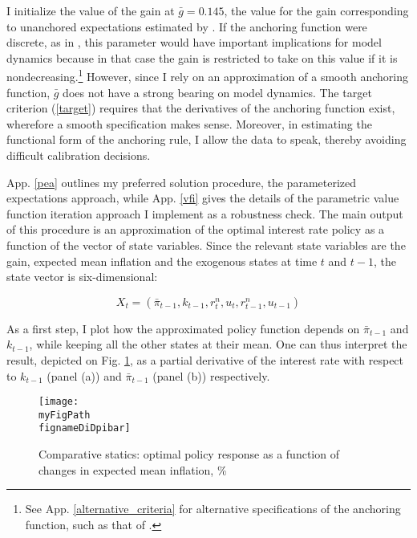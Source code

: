 \documentclass[11pt]{article}
\def \myFigPath {../../figures/}
\renewcommand{\[}{\begin{equation}}
\renewcommand{\]}{\end{equation}}
\def\fignameDiDk{analyze_opt_policy_ik}
\def\fignameDiDpibar{analyze_opt_policy_ip29_Jul_2020}
\begin{document}
\vspace{-1.0cm}

I initialize the value of the gain at $\bar{g}=0.145$, the value for the gain corresponding to unanchored expectations estimated by \cite{carvalho2019anchored}. If the anchoring function were discrete, as in \cite{carvalho2019anchored}, this parameter would have important implications for model dynamics because in that case the gain is restricted to take on this value if it is nondecreasing.\footnote{See App. \ref{alternative_criteria} for alternative specifications of the anchoring function, such as that of \cite{carvalho2019anchored}.} However, since I rely on an approximation of a smooth anchoring function, $\bar{g}$ does not have a strong bearing on model dynamics. The target criterion (\ref{target}) requires that the derivatives of the anchoring function exist, wherefore a smooth specification makes sense. Moreover, in estimating the functional form of the anchoring rule, I allow the data to speak, thereby avoiding difficult calibration decisions.

App. \ref{pea} outlines my preferred solution procedure, the parameterized expectations approach, while App. \ref{vfi} gives the details of the parametric value function iteration approach I implement as a robustness check. The main output of this procedure is an approximation of the optimal interest rate policy as a function of the vector of state variables. Since the relevant state variables are the gain, expected mean inflation and the exogenous states at time $t$ and $t-1$, the state vector is six-dimensional:

\begin{equation}
X_t = (\bar{\pi}_{t-1}, k_{t-1}, r^n_t, u_t, r^n_{t-1}, u_{t-1})
\end{equation}

As a first step, I plot how the approximated policy function depends on $\bar{\pi}_{t-1}$ and $k_{t-1}$, while keeping all the other states at their mean. One can thus interpret the result, depicted on Fig. \ref{di}, as a partial derivative of the interest rate with respect to $k_{t-1}$ (panel (a)) and $\bar{\pi}_{t-1}$ (panel (b)) respectively.

\begin{figure}[h!]
\texttt{[image: \\myFigPath \\fignameDiDpibar]}
\caption{Comparative statics: optimal policy response as a function of changes in expected mean inflation, \%}
\label{di}
\end{figure}
\end{document}
